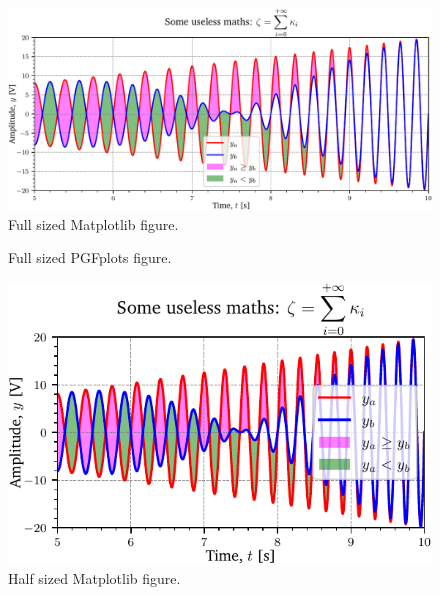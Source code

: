 \documentclass[12pt,5p, authoryear]{elsarticle}
\begin{document}
\begin{figure}[htb]
  \begin{center}
    \includegraphics[width = \textwidth]{../figures/figure_matplotlib_full}
    \caption{Full sized Matplotlib figure. }
  \end{center}
\end{figure}

\begin{figure}[htb]
  \begin{center}
    
    \caption{Full sized PGFplots figure. }
  \end{center}
\end{figure}

\begin{figure}[htb]
  \begin{center}
    \includegraphics[width = \columnwidth]{../figures/figure_matplotlib_half}
    \caption{Half sized Matplotlib figure.}
  \end{center}
\end{figure}

\blindtext[5]
\end{document}
